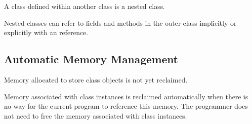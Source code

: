 A class defined within another class is a nested class.

Nested classes can refer to fields and methods in the outer class
implicitly or explicitly with an  reference.

\subsection{Automatic Memory Management}
\label{Automatic_Memory_Management}

\begin{status}
Memory allocated to store class objects is not yet reclaimed.
\end{status}

Memory associated with class instances is reclaimed automatically when
there is no way for the current program to reference this memory.  The
programmer does not need to free the memory associated with class
instances.
